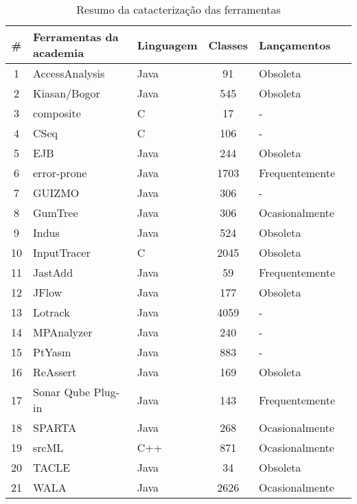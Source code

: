 \begin{table}[H]
  \caption{Resumo da catacterização das ferramentas}
  \centering
  \begin{tabular}{| c | l | l | c | l | l |}
    \hline
    \#  & Ferramentas da academia & Linguagem & Classes & Lançamentos \\
    \hline
    1  & AccessAnalysis          & Java   & 91    & Obsoleta       \\
    2  & Kiasan/Bogor            & Java   & 545   & Obsoleta       \\
    3  & composite               & C      & 17    & -              \\
    4  & CSeq                    & C      & 106   & -              \\
    5  & EJB                     & Java   & 244   & Obsoleta       \\
    6  & error-prone             & Java   & 1703  & Frequentemente \\
    7  & GUIZMO                  & Java   & 306   & -              \\
    8  & GumTree                 & Java   & 306   & Ocasionalmente \\
    9  & Indus                   & Java   & 524   & Obsoleta       \\
    10 & InputTracer             & C      & 2045  & Obsoleta       \\
    11 & JastAdd                 & Java   & 59    & Frequentemente \\
    12 & JFlow                   & Java   & 177   & Obsoleta       \\
    13 & Lotrack                 & Java   & 4059  & -              \\
    14 & MPAnalyzer              & Java   & 240   & -              \\
    15 & PtYasm                  & Java   & 883   & -              \\
    16 & ReAssert                & Java   & 169   & Obsoleta       \\
    17 & Sonar Qube Plug-in      & Java   & 143   & Frequentemente \\
    18 & SPARTA                  & Java   & 268   & Ocasionalmente \\
    19 & srcML                   & C++    & 871   & Ocasionalmente \\
    20 & TACLE                   & Java   & 34    & Obsoleta       \\
    21 & WALA                    & Java   & 2626  & Ocasionalmente \\

\end{tabular}
\end{table}
